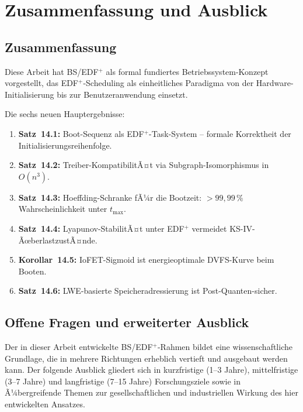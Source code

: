 ﻿\documentclass[a4paper,12pt]{scrreprt}
\theoremstyle{definition}
\begin{document}
	\chapter{Zusammenfassung und Ausblick}
	
	\section{Zusammenfassung}
	
	Diese Arbeit hat BS/EDF$^+$ als formal fundiertes Betriebssystem-Konzept
	vorgestellt, das EDF$^+$-Scheduling als einheitliches Paradigma von der
	Hardware-Initialisierung bis zur Benutzeranwendung einsetzt.
	
	Die sechs neuen Hauptergebnisse:
	\begin{enumerate}
		\item \textbf{Satz~14.1:} Boot-Sequenz als EDF$^+$-Task-System --
		formale Korrektheit der Initialisierungsreihenfolge.
		\item \textbf{Satz~14.2:} Treiber-KompatibilitÃ¤t via Subgraph-Isomorphismus
		in $O(n^3)$.
		\item \textbf{Satz~14.3:} Hoeffding-Schranke fÃ¼r die Bootzeit:
		$> 99{,}99\,\%$ Wahrscheinlichkeit unter $t_{\max}$.
		\item \textbf{Satz~14.4:} Lyapunov-StabilitÃ¤t unter EDF$^+$ vermeidet
		KS-IV-ÃœberlastzustÃ¤nde.
		\item \textbf{Korollar~14.5:} IoFET-Sigmoid ist energieoptimale
		DVFS-Kurve beim Booten.
		\item \textbf{Satz~14.6:} LWE-basierte Speicheradressierung ist
		Post-Quanten-sicher.
	\end{enumerate}
	
	\section{Offene Fragen und erweiterter Ausblick}
	
	Der in dieser Arbeit entwickelte BS/EDF$^+$-Rahmen bildet eine wissenschaftliche
	Grundlage, die in mehrere Richtungen erheblich vertieft und ausgebaut werden kann.
	Der folgende Ausblick gliedert sich in kurzfristige (1--3 Jahre),
	mittelfristige (3--7 Jahre) und langfristige (7--15 Jahre) Forschungsziele
	sowie in Ã¼bergreifende Themen zur gesellschaftlichen und industriellen
	Wirkung des hier entwickelten Ansatzes.
	
\end{document}
